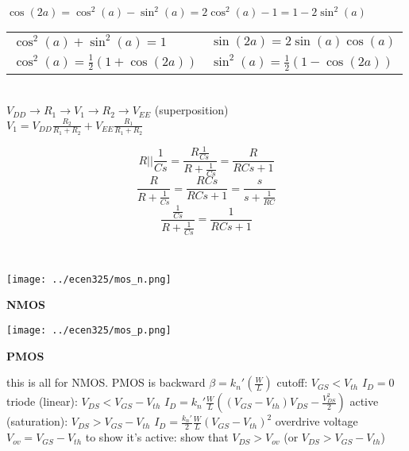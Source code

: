 \documentclass[12pt]{article}
\begin{document}
\begin{spacing}{0.8}
\begin{multicols*}{2}
\begin{flushleft}
\begin{outline}[longenum]
\\
$\cos(2a)=\cos^2(a) - \sin^2(a) = 2\cos^2(a)-1 = 1-2\sin^2(a)$
\\
\begin{tabular}{l|l}
$\cos^2(a)+\sin^2(a)=1$ & $\sin(2a) = 2\sin(a)\cos(a)$ \\
$\cos^2(a) = \frac{1}{2}(1 + \cos(2a))$ & $\sin^2(a) = \frac{1}{2}(1 - \cos(2a))$ \\
\end{tabular}

\\ $V_{DD} \rightarrow R_1 \rightarrow V_1 \rightarrow R_2 \rightarrow V_{EE}$
\hfill(superposition)
\\ $V_1=V_{DD}\frac{R_2}{R_1+R_2}+V_{EE}\frac{R_1}{R_1+R_2}$

$$R||\frac{1}{Cs}
  = \frac{ R\frac{1}{Cs} }{ R+\frac{1}{Cs} }
  = \frac{R}{RCs+1}
$$
$$\frac{R}{R+\frac{1}{Cs}} = \frac{ RCs }{ RCs + 1 } = \frac{s}{s+\frac{1}{RC}}$$
$$\frac{ \frac{1}{Cs} }{ R + \frac{1}{Cs} } = \frac{1}{RCs + 1}$$


\\
\begin{minipage}{0.49\columnwidth}
\texttt{[image: ../ecen325/mos\_n.png]}
\begin{center}
\vspace{-10px}
\textbf{NMOS}
\end{center}
\end{minipage}
\begin{minipage}{0.49\columnwidth}
\texttt{[image: ../ecen325/mos\_p.png]}
\begin{center}
\vspace{-10px}
\textbf{PMOS}
\end{center}
\end{minipage}

  \1 this is all for NMOS. PMOS is backward
  \1 $\beta = k_n' (\frac{W}{L})$
  \1 cutoff: $V_{GS} < V_{th}$
    \2 $I_D=0$
  \1 triode (linear): $V_{DS} < V_{GS}-V_{th}$
    \2 $I_D = k_n' \frac{W}{L}
    \left( (V_{GS}-V_{th})V_{DS} - \frac{V_{DS}^2}{2} \right)$
  \1 active (saturation): $V_{DS} > V_{GS}-V_{th}$
    \2 $I_D = \frac{k_n'}{2}\frac{W}{L}(V_{GS}-V_{th})^2$
    \2 overdrive voltage $V_{ov}=V_{GS}-V_{th}$
  \1 to show it's active: show that $V_{DS} > V_{ov}$ (or $V_{DS} > V_{GS} - V_{th}$)


\end{outline}
\end{flushleft}
\end{multicols*}
\end{spacing}
\end{document}
